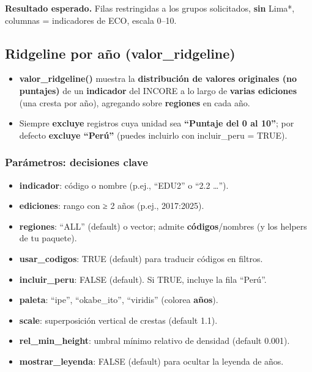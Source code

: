 \documentclass[
  11pt,
  letterpaper,
  DIV=11,
  numbers=noendperiod]{scrartcl}
\begin{document}
\textbf{Resultado esperado.} Filas restringidas a los grupos
solicitados, \textbf{sin} Lima*, columnas = indicadores de ECO, escala
0--10.

\subsection{\texorpdfstring{\textbf{Ridgeline por año
(valor\_ridgeline)}}{Ridgeline por año (valor\_ridgeline)}}\label{ridgeline-por-auxf1o-valor_ridgeline}

\begin{itemize}
\item
  \textbf{valor\_ridgeline()} muestra la \textbf{distribución de valores
  originales (no puntajes)} de un \textbf{indicador} del INCORE a lo
  largo de \textbf{varias ediciones} (una cresta por año), agregando
  sobre \textbf{regiones} en cada año.
\item
  Siempre \textbf{excluye} registros cuya unidad sea \textbf{``Puntaje
  del 0 al 10''}; por defecto \textbf{excluye ``Perú''} (puedes
  incluirlo con incluir\_peru = TRUE).
\end{itemize}

\subsubsection{\texorpdfstring{\textbf{Parámetros: decisiones
clave}}{Parámetros: decisiones clave}}\label{paruxe1metros-decisiones-clave-6}

\begin{itemize}
\item
  \textbf{indicador}: código o nombre (p.ej., ``EDU2'' o ``2.2
  \ldots{}'').
\item
  \textbf{ediciones}: rango con ≥ 2 años (p.ej., 2017:2025).
\item
  \textbf{regiones}: ``ALL'' (default) o vector; admite
  \textbf{códigos}/nombres (y los helpers de tu paquete).
\item
  \textbf{usar\_codigos}: TRUE (default) para traducir códigos en
  filtros.
\item
  \textbf{incluir\_peru}: FALSE (default). Si TRUE, incluye la fila
  ``Perú''.
\item
  \textbf{paleta}: ``ipe'', ``okabe\_ito'', ``viridis'' (colorea
  \textbf{años}).
\item
  \textbf{scale}: superposición vertical de crestas (default 1.1).
\item
  \textbf{rel\_min\_height}: umbral mínimo relativo de densidad (default
  0.001).
\item
  \textbf{mostrar\_leyenda}: FALSE (default) para ocultar la leyenda de
  años.
\end{itemize}
\end{document}
